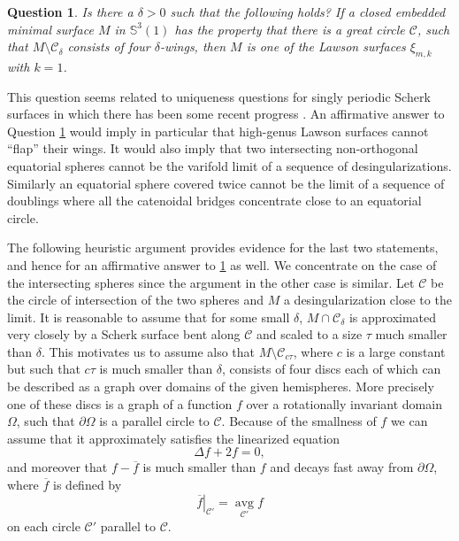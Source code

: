 \documentclass[12pt,namelimits,sumlimits]{amsart}
\newtheorem{question}[theorem]{Question}
\theoremstyle{remark}
\numberwithin{equation}{section}
\begin{document}
\addtocounter{equation}{1}
\begin{question}
\label{QLone}
Is there a $\delta>0$ such that the following holds?
If a closed embedded minimal surface $M$ in ${\mathbb{S}}^3(1)$ has the property that there is a great circle ${{\mathcal{C}}}$,
such that $M\setminus {{\mathcal{C}}}_\delta$ consists of four $\delta$-wings,
then $M$ is one of the Lawson surfaces $\xi_{m,k}$ with $k=1$.
\end{question}

This question seems related to uniqueness questions for singly periodic Scherk surfaces
in which there has been some recent progress 
\cite{meeks:unique}.
An affirmative answer to Question \ref{QLone} would imply 
in particular that high-genus Lawson surfaces cannot ``flap'' their wings.
It would also imply that two intersecting non-orthogonal equatorial spheres
cannot be the varifold limit of a sequence of desingularizations.
Similarly an equatorial sphere covered twice cannot be the limit of a sequence
of doublings where all the catenoidal bridges concentrate close to an equatorial circle.

The following heuristic argument provides evidence for the last two statements,
and hence for an affirmative answer to \ref{QLone} as well.
We concentrate on the case of the intersecting spheres since the argument in the other case is similar.
Let ${{\mathcal{C}}}$ be the circle of intersection of the two spheres
and $M$ a desingularization close to the limit.
It is reasonable to assume that for some small $\delta$,
$M\cap {{\mathcal{C}}}_\delta$ is approximated very closely by a Scherk surface bent along ${{\mathcal{C}}}$
and scaled to a size $\tau$ much smaller than $\delta$.
This motivates us to assume also that $M\setminus {{\mathcal{C}}}_{c\tau}$,
where $c$ is a large constant but such that $c\tau$ is much smaller than $\delta$,
consists of four discs each of which can be described as a graph over domains of the given hemispheres.
More precisely one of these discs is a graph of a function $f$ over a rotationally invariant domain $\Omega$,
such that $\partial\Omega$ is a parallel circle to ${{\mathcal{C}}}$.
Because of the smallness of $f$ we can assume that it approximately satisfies the linearized equation
$$
\Delta f + 2 f=0,
$$
and moreover that $f-\overline{f}$ is much smaller than $f$ and decays fast away from $\partial\Omega$,
where $\overline{f}$ is defined by
$$
\left.\overline{f}\right|_{{{\mathcal{C}}}'}
=
\operatorname*{avg}_{{{\mathcal{C}}}'} f
$$
on each circle ${{\mathcal{C}}}'$ parallel to ${{\mathcal{C}}}$.
\end{document}

